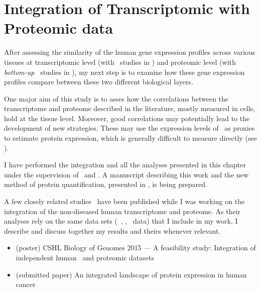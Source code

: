 \chapter{Integration of Transcriptomic with Proteomic data}\label{ch:Integration}
\setlength{\epigraphwidth}{0.8\textwidth}
\setlength{\epigraphrule}{0pt}


After assessing the similarity of the human gene expression profiles
across various tissues
at transcriptomic level (with \Rnaseq\ studies in )
and proteomic level (with \emph{bottom-up} \ms\ studies in ),
my next step is to examine how these gene expression profiles
compare between these two different biological layers.

One major aim of this study is to asses
how the correlations between the transcriptome and proteome
described in the literature, mostly measured in cells,
hold at the tissue level.
Moreover, good correlations may potentially lead to
the development of new strategies.
These may use the expression levels of \mRNA\ as proxies
to estimate protein expression,
which is generally difficult to measure directly (see ).

I have performed the integration and all the analyses presented in this chapter
under the supervision of \alvis\ and \jyoti.
A manuscript describing this work
and the new method of protein quantification, presented in ,
is being prepared.

A few closely related studies~ have
been published while I was working on
the integration of the non-diseased human transcriptome and proteome.
As their analyses rely on the same data sets (\ie\ \uhlen, \gtex, \pandey\ data)
that I include in my work,
I describe and discuss together my results and theirs
whenever relevant.

\derivativeWork{}
\begin{itemize}[topsep=0pt,nosep]
    \item (poster) CSHL  Biology of Genomes 2015 --- A feasibility study:
        Integration of independent human \Rnaseq\ and proteomic datasets
    \item (submitted paper) An integrated landscape of protein expression in human cancer
\end{itemize}

